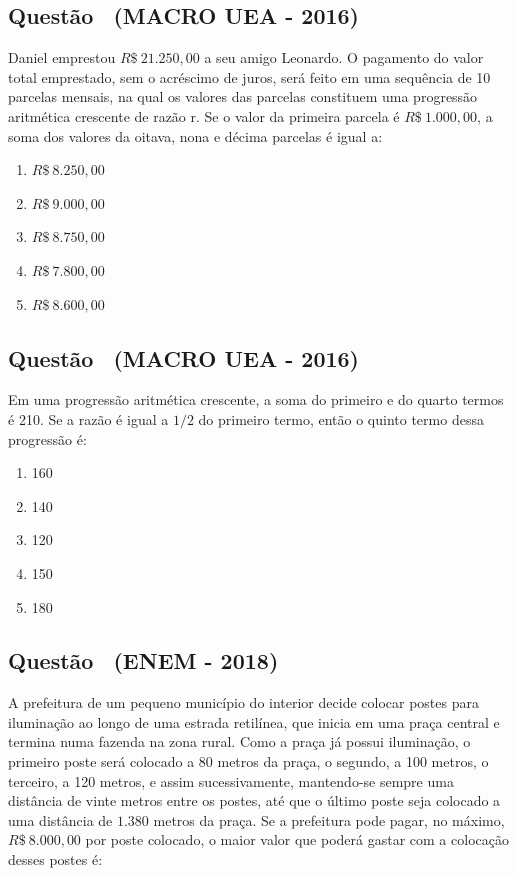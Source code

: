 \documentclass[12pt]{article}
\newcounter{questao}
\newcommand{\novaquestao}[1]{%
  \stepcounter{questao}%
  \subsection*{Questão \thequestao\ (#1)}%
}
\begin{document}
\begin{multicols}{2}
            \novaquestao{MACRO UEA - 2016}

                Daniel emprestou $R\$\ 21.250,00$ a seu amigo Leonardo. O pagamento do valor total emprestado, sem o acréscimo de juros, será feito em uma sequência de 10 parcelas mensais, na qual os valores das parcelas constituem uma progressão aritmética crescente de razão r. Se o valor da primeira parcela é $R\$\ 1.000,00$, a soma dos valores da oitava, nona e décima parcelas é igual a:
            
                \begin{enumerate}[label=(\alph*), noitemsep]
                    \item $R\$\ 8.250,00$
                    \item $R\$\ 9.000,00$
                    \item $R\$\ 8.750,00$
                    \item $R\$\ 7.800,00$
                    \item $R\$\ 8.600,00$
                \end{enumerate}

        \novaquestao{MACRO UEA - 2016}
        
            Em uma progressão aritmética crescente, a soma do primeiro e do quarto termos é 210. Se a razão é igual a ${1}/{2}$ do primeiro termo, então o quinto termo dessa progressão é:
        
            \begin{enumerate}[label=(\alph*), noitemsep]
                \item 160
                \item 140
                \item 120
                \item 150
                \item 180
            \end{enumerate}

        \novaquestao{ENEM - 2018}

            A prefeitura de um pequeno município do interior decide colocar postes para iluminação ao longo de uma estrada retilínea, que inicia em uma praça central e termina numa fazenda na zona rural. 
            Como a praça já possui iluminação, o primeiro poste será colocado a 80 metros da praça, o segundo, a 100 metros, o terceiro, a 120 metros, e assim sucessivamente, mantendo-se sempre uma distância de vinte metros entre os postes, até que o último poste seja colocado a uma distância de $1.380$ metros da praça. Se a prefeitura pode pagar, no máximo, $R\$\ 8.000,00$ por poste colocado, o maior valor que poderá gastar com a colocação desses postes é:


\end{multicols}
\end{document}
